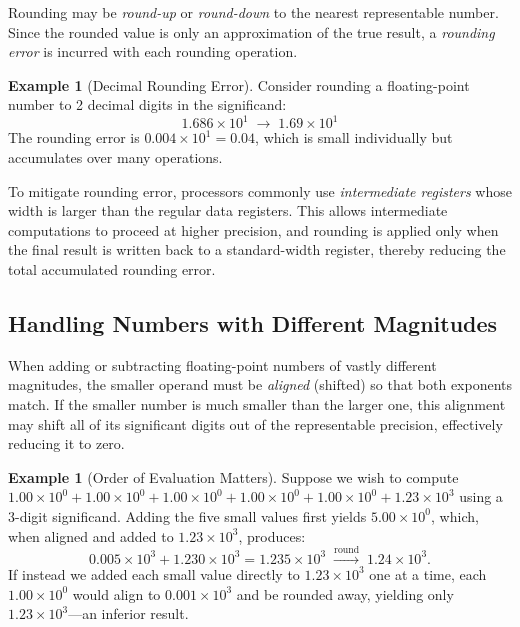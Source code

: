 \documentclass[11pt, a4paper, notitlepage]{report}
\theoremstyle{definition}
\theoremstyle{remark}
\theoremstyle{definition}
\newtheorem{example}[theorem]{Example}
\begin{document}
Rounding may be \emph{round-up} or \emph{round-down} to the nearest representable number. Since the rounded value is only an approximation of the true result, a \emph{rounding error} is incurred with each rounding operation.

\begin{example}[Decimal Rounding Error]
  \label{ex:rounding-fp}
  Consider rounding a floating-point number to 2 decimal digits in the significand:
  \[
    1.686 \times 10^{1} \;\longrightarrow\; 1.69 \times 10^{1}
  \]
  The rounding error is $0.004 \times 10^{1} = 0.04$, which is small individually but accumulates over many operations.
\end{example}

To mitigate rounding error, processors commonly use \emph{intermediate registers} whose width is larger than the regular data registers. This allows intermediate computations to proceed at higher precision, and rounding is applied only when the final result is written back to a standard-width register, thereby reducing the total accumulated rounding error.

\subsection{Handling Numbers with Different Magnitudes}
\label{sec:magnitude-ordering}

When adding or subtracting floating-point numbers of vastly different magnitudes, the smaller operand must be \emph{aligned} (shifted) so that both exponents match. If the smaller number is much smaller than the larger one, this alignment may shift all of its significant digits out of the representable precision, effectively reducing it to zero.

\begin{example}[Order of Evaluation Matters]
  \label{ex:eval-order}
  Suppose we wish to compute $1.00 \times 10^{0} + 1.00 \times 10^{0} + 1.00 \times 10^{0} + 1.00 \times 10^{0} + 1.00 \times 10^{0} + 1.23 \times 10^{3}$ using a 3-digit significand. Adding the five small values first yields $5.00 \times 10^{0}$, which, when aligned and added to $1.23 \times 10^{3}$, produces:
  \[
    0.005 \times 10^{3} + 1.230 \times 10^{3} = 1.235 \times 10^{3}
    \;\xrightarrow{\text{round}}\; 1.24 \times 10^{3}.
  \]
  If instead we added each small value directly to $1.23 \times 10^{3}$ one at a time, each $1.00 \times 10^{0}$ would align to $0.001 \times 10^{3}$ and be rounded away, yielding only $1.23 \times 10^{3}$---an inferior result.
\end{example}
\end{document}
